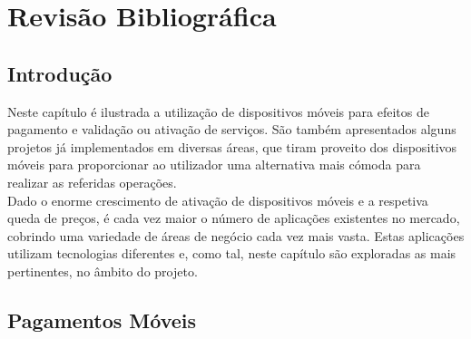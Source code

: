 \chapter{Revisão Bibliográfica} \label{chap:sota}

\section*{}

%

\section{Introdução}

Neste capítulo é ilustrada a utilização de dispositivos móveis para efeitos de pagamento e validação ou ativação de serviços. São também apresentados alguns projetos já implementados em diversas áreas, que tiram proveito dos dispositivos móveis para proporcionar ao utilizador uma alternativa mais cómoda para realizar as referidas operações.
\\Dado o enorme crescimento de ativação de dispositivos móveis e a respetiva queda de preços, é cada vez maior o número de aplicações existentes no mercado, cobrindo uma variedade de áreas de negócio cada vez mais vasta. Estas aplicações utilizam tecnologias diferentes e, como tal, neste capítulo são exploradas as mais pertinentes, no âmbito do projeto.

\section{Pagamentos Móveis}\label{sec:pagmov}

